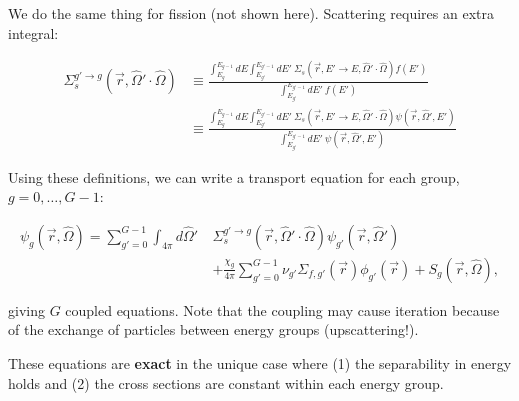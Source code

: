 \documentclass[12pt]{article}
\newcommand{\rvec}{\ensuremath{\vec{r}}}
\newcommand{\vecr}{\ensuremath{\vec{r}}}
\newcommand{\vOmega}{\ensuremath{\hat{\Omega}}}
\begin{document}
We do the same thing for fission (not shown here). Scattering requires an 
extra integral:

\begin{align*}
\Sigma_{s}^{g'\rightarrow g}(\vecr, \vOmega' \cdot \vOmega) & \equiv 
\frac{\int_{E_g}^{E_{g-1}} dE \int_{E_{g'}}^{E_{g'-1}} dE' \:
\Sigma_s(\vecr,E'\rightarrow E, \vOmega' \cdot \vOmega) f(E')}
{\int_{E_{g'}}^{E_{g'-1}} dE' \: f(E')}\\
& \equiv \frac{\int_{E_g}^{E_{g-1}} dE \int_{E_{g'}}^{E_{g'-1}} dE' \:
\Sigma_s(\vecr, E'\rightarrow E, \vOmega' \cdot \vOmega)
\psi(\rvec, \vOmega', E')}{\int_{E_{g'}}^{E_{g'-1}} dE' \:
\psi(\rvec, \vOmega', E')}
\end{align*}

Using these definitions, we can write a transport equation for each 
group, $g = 0,\dots, G-1$:

\begin{align*}
[\vOmega \cdot \nabla + \Sigma_{t,g}(\vec{r})]\psi_g(\vec{r}, \vOmega) =  
\sum_{g'=0}^{G-1} \int_{4 \pi} d\vOmega'\:
&\Sigma_{s}^{g'\rightarrow g}(\vec{r}, \vOmega' \cdot \vOmega) \psi_{g'}(\vec{r}, \vOmega')\\
&+\frac{\chi_g}{4 \pi}\sum_{g'=0}^{G-1} \nu_{g'}\Sigma_{f,g'}(\vec{r})
\phi_{g'}(\vec{r}) + S_g(\vec{r}, \vOmega),
\end{align*}

giving $G$ coupled equations. Note that the coupling may cause iteration 
because of the exchange of particles between energy groups (upscattering!). 

These equations are \textbf{exact} in the unique case where (1) the 
separability in energy holds and (2) the cross sections are constant within 
each energy group. 
\end{document}
